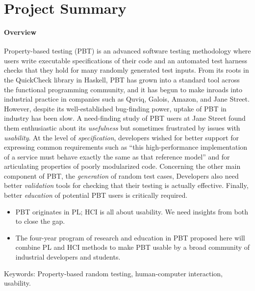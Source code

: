 \section*{Project Summary}


\paragraph*{Overview}
Property-based testing (PBT) is an advanced software testing
methodology where users write executable specifications of their code
and an automated test harness checks that they hold for many randomly
generated test inputs.  From its roots in the QuickCheck library in
Haskell, PBT has grown into a standard tool across the functional
programming community, and it has begun to make inroads into
industrial practice in companies such as Quviq, Galois, Amazon, and
Jane Street.
%
However, despite its well-established bug-finding power, uptake of PBT
in industry has been slow.  A need-finding study of PBT users at Jane
Street found them enthusiastic about its {\em usefulness} but
sometimes frustrated by issues with {\em usability}.
%
At the level of {\em specification}, developers wished for better
support for expressing common requirements such as ``this
high-performance implementation of a service must behave exactly the
same as that reference model'' and for articulating properties of
poorly modularized code.
% 
Concerning the other main component of PBT, the {\em generation} of
random test cases, 
%
Developers also need better {\em validation} tools for checking
that their testing is actually effective.
%
Finally, better {\em education} of potential PBT users is critically
required.


\begin{itemize}
\item PBT originates in PL; HCI is all about usability.  We need
insights from both to close the gap.
\item The four-year program of research and education in
PBT proposed here will combine PL and HCI methods to make PBT usable by a broad
community of industrial developers and students.
\end{itemize}

Keywords: Property-based random testing, human-computer interaction,
usability.

